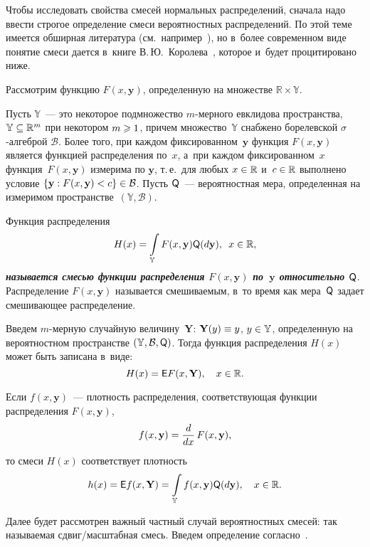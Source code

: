 \begin{multicols}{2}
Чтобы исследовать свойства смесей нормальных распределений, сначала надо ввести 
строгое определение смеси вероятностных распределений. По этой теме имеется обширная 
литература (см.\ например~\cite{teicher_60, teicher_63}), но в~более современном виде 
понятие смеси дается в~книге В.\,Ю.~Королева~\cite{korolev}, которое и~будет процитировано ниже.

Рассмотрим функцию $F (x, \textbf{y})$, определенную на множестве $\mathbb{R} \times \mathbb{Y}.$

Пусть $\mathbb{Y}$~--- это некоторое подмножество $m$-мер\-но\-го 
евклидова пространства, $\mathbb{Y}\hm\subseteq\mathbb{R}^m$ при некотором $m \hm\geqslant 1$, 
причем множество~$\mathbb{Y}$ снабжено борелевской $\sigma$-ал\-геб\-рой $\mathcal{B}$. 
Более того, при каждом фиксированном~$\textbf{y}$ функция $F (x, \mathbf{y})$ 
является функцией распределения по~$x$, а~при каждом фиксированном~$x$ функция~$F (x, \mathbf{y})$ 
измерима по $\mathbf{y}$, т.\,е.\ для любых $x \hm\in \mathbb{R}$ и~$c \hm\in \mathbb{R}$ 
выполнено условие $\{\mathbf{y} : F (x, \mathbf{y}) \hm< c\} \hm\in \mathcal{B}$. Пусть 
${\sf Q}$~--- вероятностная мера, определенная на измеримом пространстве~$(\mathbb{Y}, \mathcal{B})$.

Функция распределения
$$
        H(x) = \int\limits_ \mathbb{Y} F (x, \mathbf{y}) {\sf Q} (d\mathbf{y}), \enskip  x \in \mathbb{R},
$$
{\bfseries\textit{называется смесью функции распределения $F (x, \textbf{y})$ по~$\textbf{y}$
 относительно $\sf Q$}}. Распределение $F (x, \mathbf{y})$ называется смешиваемым, в~то время как мера~$\sf Q$ 
 задает смешивающее распределение.

Введем $m$-мерную случайную величину~$\mathbf{Y}$: $\mathbf{Y}(y) \hm\equiv y$, $y \hm\in \mathbb{Y}$,  
определенную на вероятностном пространстве $(\mathbb{Y}, \mathcal{B},{\sf Q})$. Тогда
функция распределения $H(x)$ может быть записана в~виде:
$$
        H(x) = {\sf E} F (x, \mathbf{Y}), \quad  x \in \mathbb{R}.
$$

Если $f(x, \mathbf{y})$~--- плотность распределения, соответствующая функции 
распределения $F (x, \mathbf{y})$,
$$
f(x, \mathbf{y}) = \displaystyle\frac{\displaystyle d\mathstrut}{\displaystyle dx\mathstrut} \, F (x,\mathbf{y}),
$$
то смеси $H(x)$ соответствует плотность
$$
        h(x) = {\sf E} f(x, \mathbf{Y}) = \int\limits_ \mathbb{Y} f(x, \textbf{y}) 
        {\sf Q} (d\mathbf{y}), \quad  x \in \mathbb{R}.
$$

Далее будет рассмотрен важный частный случай вероятностных смесей: 
так называемая сдвиг/мас\-штаб\-ная смесь. Введем определение согласно~\cite{korolev}.


\end{multicols}

